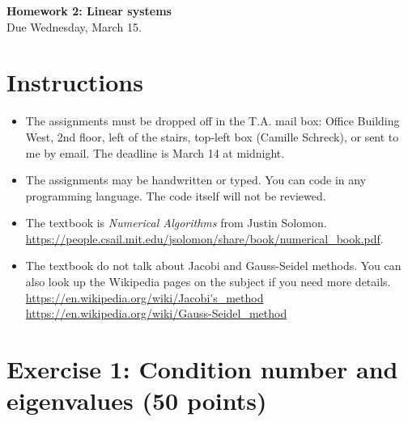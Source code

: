 


\begin{center}
{\large\textbf{Homework 2: Linear systems}}\\
Due Wednesday, March 15.
\end{center}

\noindent\makebox[\linewidth]{\rule{\linewidth}{0.6pt}}
 
\section*{Instructions}

\begin{itemize}
\item The assignments must be dropped off in the T.A. mail box: Office Building West, 2nd floor, left of the stairs, top-left box (Camille Schreck), or sent to me by email. The deadline is March 14  at midnight.
\item The assignments may be handwritten or typed. You can code in any programming language. The code itself will not be reviewed. 
\item The textbook is \emph{Numerical Algorithms} from Justin Solomon.\\ \url{https://people.csail.mit.edu/jsolomon/share/book/numerical_book.pdf}.
\item The textbook do not talk about Jacobi and Gauss-Seidel methods. You can also look up the Wikipedia pages on the subject if you need more details.\\
  \url{https://en.wikipedia.org/wiki/Jacobi's_method}\\
  \url{https://en.wikipedia.org/wiki/Gauss-Seidel_method}
  
\end{itemize}



\noindent\makebox[\linewidth]{\rule{\linewidth}{0.6pt}}

\section*{Exercise 1: Condition number and eigenvalues \normalsize \textnormal(50 points)}

\begin{correction}
\end{correction}
